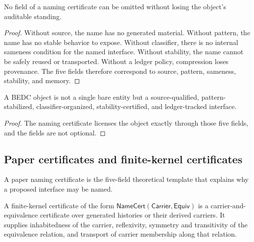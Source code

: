 \begin{theorem}
\label{thm:philosophy-namecert-five-fields-irreducible}
No field of a naming certificate can be omitted without losing the
object's auditable standing.
\end{theorem}
\begin{proof}
Without source, the name has no generated material. Without pattern,
the name has no stable behavior to expose. Without classifier, there is
no internal sameness condition for the named interface. Without
stability, the name cannot be safely reused or transported. Without a
ledger policy, compression loses provenance. The five fields therefore
correspond to source, pattern, sameness, stability, and memory.
\end{proof}

\begin{corollary}
\label{cor:philosophy-objects-fivefold-qualifications}
A BEDC object is not a single bare entity but a source-qualified,
pattern-stabilized, classifier-organized, stability-certified, and
ledger-tracked interface.
\end{corollary}
\begin{proof}
The naming certificate licenses the object exactly through those five
fields, and the fields are not optional.
\end{proof}

\subsection{Paper certificates and finite-kernel certificates}
\label{subsec:philosophy-paper-and-kernel-namecert}

\begin{definition}
\label{def:philosophy-paper-namecert}
A paper naming certificate is the five-field theoretical template that
explains why a proposed interface may be named.
\end{definition}

\begin{definition}
\label{def:philosophy-finite-kernel-namecert}
A finite-kernel certificate of the form
\(\mathsf{NameCert}(\mathsf{Carrier},\mathsf{Equiv})\) is a
carrier-and-equivalence certificate over generated histories or their
derived carriers. It supplies inhabitedness of the carrier, reflexivity,
symmetry and transitivity of the equivalence relation, and transport of
carrier membership along that relation.
\end{definition}

